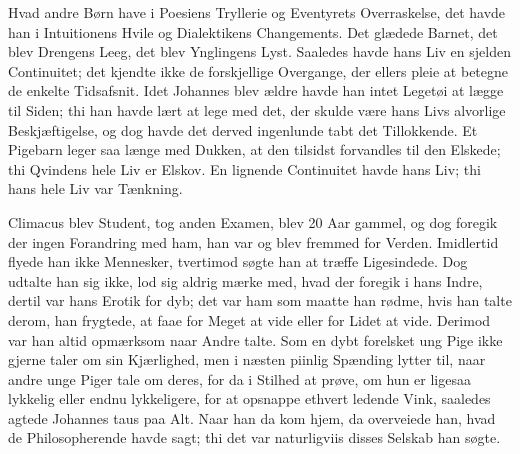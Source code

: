 \documentclass[12pt,a4paper]{article}
\begin{document}
Hvad andre Børn have i Poesiens Tryllerie og Eventyrets Overraskelse, det havde han i Intuitionens Hvile og Dialektikens Changements. Det glædede Barnet, det blev Drengens Leeg, det blev Ynglingens Lyst. Saaledes havde hans Liv en sjelden Continuitet; det kjendte ikke de forskjellige Overgange, der ellers pleie at betegne de enkelte Tidsafsnit. Idet Johannes blev ældre havde han intet Legetøi at lægge til Siden; thi han havde lært at lege med det, der skulde være hans Livs alvorlige Beskjæftigelse, og dog havde det derved ingenlunde tabt det Tillokkende. Et Pigebarn leger saa længe med Dukken, at den tilsidst forvandles til den Elskede; thi Qvindens hele Liv er Elskov. En lignende Continuitet havde hans Liv; thi hans hele Liv var Tænkning.

Climacus blev Student, tog anden Examen, blev 20 Aar gammel, og dog foregik der ingen Forandring med ham, han var og blev fremmed for Verden. Imidlertid flyede han ikke Mennesker, tvertimod søgte han at træffe Ligesindede. Dog udtalte han sig ikke, lod sig aldrig mærke med, hvad der foregik i hans Indre, dertil var hans Erotik for dyb; det var ham som maatte han rødme, hvis han talte derom, han frygtede, at faae for Meget at vide eller for Lidet at vide. Derimod var han altid opmærksom naar Andre talte. Som en dybt forelsket ung Pige ikke gjerne taler om sin Kjærlighed, men i næsten piinlig Spænding lytter til, naar andre unge Piger tale om deres, for da i Stilhed at prøve, om hun er ligesaa lykkelig eller endnu lykkeligere, for at opsnappe ethvert ledende Vink, saaledes agtede Johannes taus paa Alt. Naar han da kom hjem, da overveiede han, hvad de Philosopherende havde sagt; thi det var naturligviis disses Selskab han søgte.
\end{document}
